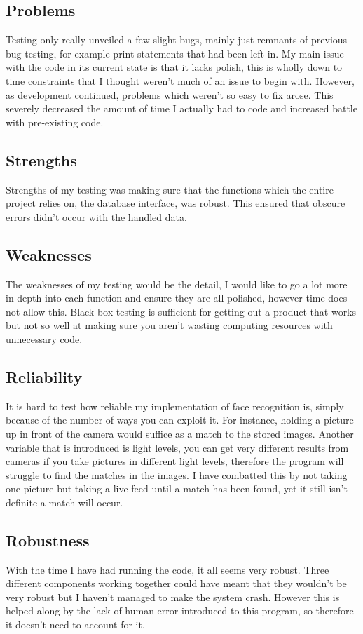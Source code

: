 \documentclass[12pt,a4paper]{report}
\begin{document}
\subsection{Problems}
Testing only really unveiled a few slight bugs, mainly just remnants of previous bug testing, for example print statements that had been left in. My main issue with the code in its current state is that it lacks polish, this is wholly down to time constraints that I thought weren’t much of an issue to begin with. However, as development continued, problems which weren’t so easy to fix arose. This severely decreased the amount of time I actually had to code and increased battle with pre-existing code. 

\subsection{Strengths}
Strengths of my testing was making sure that the functions which the entire project relies on, the database interface, was robust. This ensured that obscure errors didn’t occur with the handled data. 

\subsection{Weaknesses}
The weaknesses of my testing would be the detail, I would like to go a lot more in-depth into each function and ensure they are all polished, however time does not allow this. Black-box testing is sufficient for getting out a product that works but not so well at making sure you aren’t wasting computing resources with unnecessary code.

\subsection{Reliability}
It is hard to test how reliable my implementation of face recognition is, simply because of the number of ways you can exploit it. For instance, holding a picture up in front of the camera would suffice as a match to the stored images. Another variable that is introduced is light levels, you can get very different results from cameras if you take pictures in different light levels, therefore the program will struggle to find the matches in the images. I have combatted this by not taking one picture but taking a live feed until a match has been found, yet it still isn’t definite a match will occur.

\subsection{Robustness}
With the time I have had running the code, it all seems very robust. Three different components working together could have meant that they wouldn’t be very robust but I haven’t managed to make the system crash. However this is helped along by the lack of human error introduced to this program, so therefore it doesn’t need to account for it.
\end{document}
